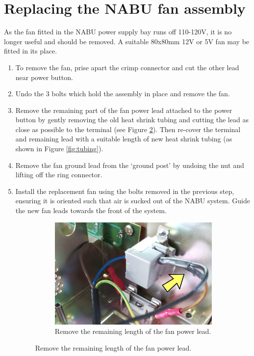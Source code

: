 \section{Replacing the NABU fan assembly}
\label{sec:fan-replacement}
As the fan fitted in the NABU power supply bay runs off 110-120V, it is no longer useful and should be removed. A suitable 80x80mm 12V or 5V fan may be fitted in its place.
\begin{enumerate}
	\item  To remove the fan, prise apart the crimp connector and cut the other lead near power button.
	\item Undo the 3 bolts which hold the assembly in place and remove the fan.
	\item Remove the remaining part of the fan power lead attached to the power button by gently removing the old heat shrink tubing and cutting the lead as close as possible to the terminal (see Figure \ref{fig:fan}). Then re-cover the terminal and remaining lead with a suitable length of new heat shrink tubing (as shown in Figure \ref{fig:tubing}).
	\item Remove the fan ground lead from the `ground post' by undoing the nut and lifting off the ring connector.
	\item Install the replacement fan using the bolts removed in the previous step, ensuring it is oriented such that air is sucked out of the NABU system. Guide the new fan leads towards the front of the system.
	\begin{figure}[h!]
		\begin{subfigure}[b]{\columnwidth}
			\includegraphics[width=\columnwidth]{images/psu-image-1a.jpg}
			\caption{Remove the remaining length of the fan power lead.}
			\label{fig:fan}

\end{subfigure}
\end{figure}
\end{enumerate}
